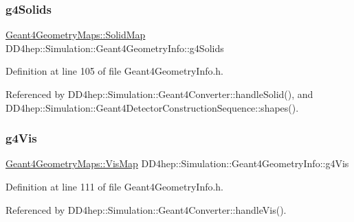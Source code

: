 \subsubsection{\texorpdfstring{g4\+Solids}{g4Solids}}
{\footnotesize\ttfamily \hyperlink{namespace_d_d4hep_1_1_simulation_1_1_geant4_geometry_maps_a5591dbffcd2e6432004034209abd630e}{Geant4\+Geometry\+Maps\+::\+Solid\+Map} D\+D4hep\+::\+Simulation\+::\+Geant4\+Geometry\+Info\+::g4\+Solids}



Definition at line 105 of file Geant4\+Geometry\+Info.\+h.



Referenced by D\+D4hep\+::\+Simulation\+::\+Geant4\+Converter\+::handle\+Solid(), and D\+D4hep\+::\+Simulation\+::\+Geant4\+Detector\+Construction\+Sequence\+::shapes().

\hypertarget{class_d_d4hep_1_1_simulation_1_1_geant4_geometry_info_a1dc6d3c046072b0a6455c00e7fc76269}{}\label{class_d_d4hep_1_1_simulation_1_1_geant4_geometry_info_a1dc6d3c046072b0a6455c00e7fc76269} 
\subsubsection{\texorpdfstring{g4\+Vis}{g4Vis}}
{\footnotesize\ttfamily \hyperlink{namespace_d_d4hep_1_1_simulation_1_1_geant4_geometry_maps_af7bb137248b77047dc34ff68d67225eb}{Geant4\+Geometry\+Maps\+::\+Vis\+Map} D\+D4hep\+::\+Simulation\+::\+Geant4\+Geometry\+Info\+::g4\+Vis}



Definition at line 111 of file Geant4\+Geometry\+Info.\+h.



Referenced by D\+D4hep\+::\+Simulation\+::\+Geant4\+Converter\+::handle\+Vis().

\hypertarget{class_d_d4hep_1_1_simulation_1_1_geant4_geometry_info_a62c7998ab4b27c040c67577a136e93e9}{}\label{class_d_d4hep_1_1_simulation_1_1_geant4_geometry_info_a62c7998ab4b27c040c67577a136e93e9} 
